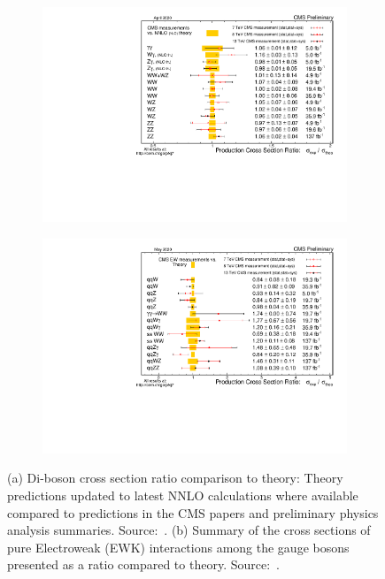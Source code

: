 \begin{figure}[htbp]
  \centering
  \begin{subfigure}[htbp]{0.48\textwidth}
    \centering
    \includegraphics[width=\textwidth]{figures_and_tables/theory/sm_vbf_results.pdf}
    \caption{}
    \label{sm_vbf_results}
  \end{subfigure}
  \hfill
  \begin{subfigure}[htbp]{0.48\textwidth}
    \centering
    \includegraphics[width=\textwidth]{figures_and_tables/theory/sm_ewk_results.pdf}
    \caption{}
    \label{sm_ewk_results}
  \end{subfigure}
  \caption{(a) Di-boson cross section ratio comparison to theory: Theory predictions updated to latest NNLO calculations where available compared to predictions in the CMS papers and preliminary physics analysis summaries. Source:~\cite{cms_sm_xsec_summary}. (b) Summary of the cross sections of pure Electroweak (EWK) interactions among the gauge bosons presented as a ratio compared to theory. Source:~\cite{cms_sm_xsec_summary}.}
\end{figure}

